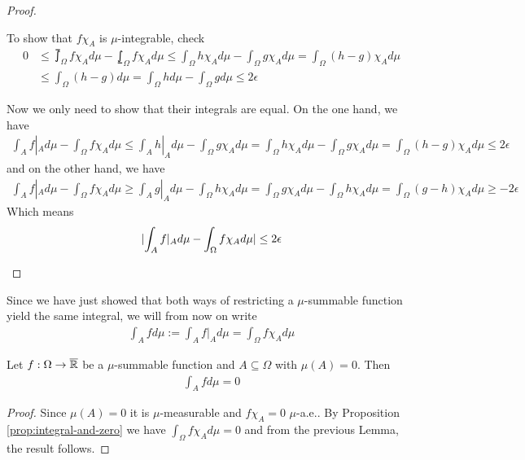 \begin{proof}
\begin{itemize}
      To show that $f \chi_A$ is $\mu$-integrable, check
      \begin{align*}
        0
        &\leq
        \upint_{\Omega} f \chi_A d \mu - \lowint_{\Omega} f \chi_A d \mu
        \leq
        \int_{\Omega} h \chi_A d \mu - \int_{\Omega} g \chi_A d \mu
        =
        \int_{\Omega} (h-g) \chi_A d \mu
        \\
        &\leq
        \int_{\Omega} (h-g) d \mu
        =
        \int_{\Omega} h d \mu - \int_{\Omega} g d \mu
        \leq 2 \epsilon
      \end{align*}

      Now we only need to show that their integrals are equal. 
      On the one hand, we have
      \begin{align*}
        \int_{A} f|_A d \mu - \int_{\Omega} f \chi_A d \mu
        \leq
        \int_{A} h|_A d \mu - \int_{\Omega} g \chi_A d \mu
        =
        \int_{\Omega} h \chi_A d \mu - \int_{\Omega} g \chi_A d \mu
        = \int_{\Omega} (h-g) \chi_A d \mu 
        \leq
        2 \epsilon
      \end{align*}
      and on the other hand, we have
      \begin{align*}
        \int_{A} f|_A d \mu - \int_{\Omega} f \chi_A d \mu
        \geq \int_{A} g|_A d \mu - \int_{\Omega} h \chi_A d \mu
        =
        \int_{\Omega} g \chi_A d \mu - \int_{\Omega} h \chi_A d \mu
        = \int_{\Omega} (g-h) \chi_A d \mu
        \geq - 2 \epsilon
      \end{align*}
      Which means
      \begin{align*}
        \abs{\int_{A} f|_A d \mu - \int_{\Omega} f \chi_A d \mu} \leq 2 \epsilon
      \end{align*}
  \end{itemize}
\end{proof}

Since we have just showed that both ways of restricting a $\mu$-summable function yield the same integral, we will from now on write
\begin{align*}
  \int_{A} f d \mu := \int_{A} f|_A d \mu = \int_{\Omega} f \chi_A d \mu
\end{align*}


\begin{cor}[]\label{cor:restriction-to-zero}
  Let $f: \Omega \to \overline{\mathbb{R}}$ be a $\mu$-summable function and $A \subseteq \Omega$ with $\mu(A) = 0$. Then
  \begin{align*}
    \int_{A} f d \mu = 0
  \end{align*}
\end{cor}
\begin{proof}
  Since $\mu(A) = 0$ it is $\mu$-measurable and $f \chi_A= 0$ $\mu$-a.e.. 
  By Proposition \ref{prop:integral-and-zero} we have $\int_{\Omega} f \chi_A d \mu = 0$ and from the previous Lemma, the result follows.
\end{proof}


